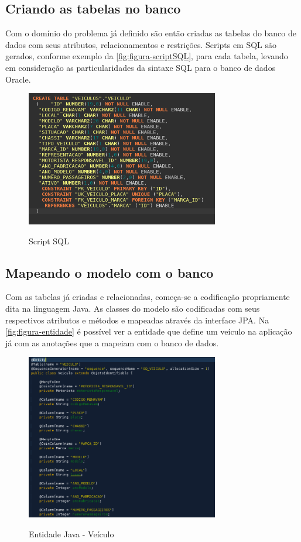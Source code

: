 \subsection{Criando as tabelas no banco}
\label{sbs:desenvolvimentoTabelas}

Com o domínio do problema já definido são então criadas as tabelas do banco de dados com seus atributos, relacionamentos e restrições.
Scripts em SQL são gerados, conforme exemplo da \autoref{fig:figura-scriptSQL}, para cada tabela, levando em consideração as particularidades da sintaxe SQL para o banco de dados Oracle. 

\begin{figure}[!htb]
    \centering
    \caption{Script SQL}
    \includegraphics[width=0.75\textwidth]{dados/figuras/scriptSQL.png}
    \label{fig:figura-scriptSQL}
\end{figure}

\subsection{Mapeando o modelo com o banco}
\label{sbs:desenvolvimentoMapeamento}

Com as tabelas já criadas e relacionadas, começa-se a codificação propriamente dita na linguagem Java. As classes do modelo são codificadas com seus respectivos atributos e métodos e mapeadas através da interface JPA. Na \autoref{fig:figura-entidade} é possível ver a entidade que define um veículo na aplicação já com as anotações que a mapeiam com o banco de dados.

\begin{figure}[!htb]
    \centering
    \caption{Entidade Java - Veículo}
    \includegraphics[width=0.75\textwidth]{dados/figuras/entidade.png}
    \label{fig:figura-entidade}
\end{figure}

